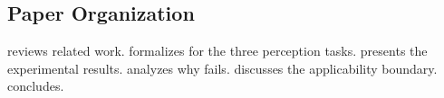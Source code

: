 \subsection{Paper Organization}

 reviews related work. 
 formalizes \ZSP for the three perception tasks. 
 presents the experimental results. 
 analyzes why \ZSP fails. 
 discusses the applicability boundary. 
 concludes.
